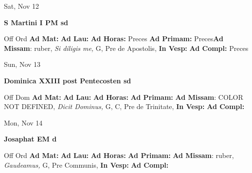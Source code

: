 \documentclass[10pt]{book}
\begin{document}
\begin{center}
\begin{minipage}{3.5in}
\vspace{2em}
\begin{center}Sat, Nov 12
\end{center}
\textbf{ \large S Martini I PM
\textnormal{\normalsize sd}}

\begin{justify}Off Ord
\textbf{Ad Mat: }
\textbf{Ad Lau: }
\textbf{Ad Horas: }Preces
\textbf{Ad Primam: }Preces\textbf{Ad Missam}: ruber, \textit{Si diligis me,} G, Pre de Apostolis, 
\textbf{In Vesp: }
\textbf{Ad Compl: }Preces
\end{justify}
\end{minipage}
\end{center}

\begin{center}
\begin{minipage}{3.5in}
\vspace{2em}
\begin{center}Sun, Nov 13
\end{center}
\textbf{ \large Dominica XXIII post Pentecosten
\textnormal{\normalsize sd}}

\begin{justify}Off Dom
\textbf{Ad Mat: }
\textbf{Ad Lau: }
\textbf{Ad Horas: }
\textbf{Ad Primam: }\textbf{Ad Missam}: COLOR NOT DEFINED, \textit{Dicit Dominus,} G, C, Pre de Trinitate, 
\textbf{In Vesp: }
\textbf{Ad Compl: }
\end{justify}
\end{minipage}
\end{center}

\begin{center}
\begin{minipage}{3.5in}
\vspace{2em}
\begin{center}Mon, Nov 14
\end{center}
\textbf{ \large Josaphat EM
\textnormal{\normalsize d}}

\begin{justify}Off Ord
\textbf{Ad Mat: }
\textbf{Ad Lau: }
\textbf{Ad Horas: }
\textbf{Ad Primam: }\textbf{Ad Missam}: ruber, \textit{Gaudeamus,} G, Pre Communis, 
\textbf{In Vesp: }
\textbf{Ad Compl: }
\end{justify}
\end{minipage}
\end{center}
\end{document}
